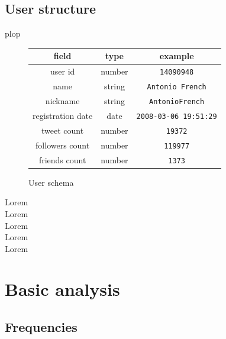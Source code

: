 \documentclass[a4paper,12pt]{report}
\begin{document}
\subsection{User structure}
plop
\begin{figure}[h!]
\centering
\begin{tabular}{c|c|c}
field & type & example\\
\midrule
user id & number & \texttt{14090948} \\ \hline
name & string & \texttt{Antonio French} \\ \hline
nickname & string & \texttt{AntonioFrench} \\ \hline
registration date & date & \texttt{2008-03-06 19:51:29} \\ \hline
tweet count & number & \texttt{19372} \\ \hline
followers count & number & \texttt{119977} \\ \hline
friends count & number & \texttt{1373} \\ \hline
\end{tabular}
\caption{User schema}
\end{figure}
Lorem\\
Lorem\\
Lorem\\
Lorem\\
Lorem\\
\newpage
\section{Basic analysis}

\subsection{Frequencies}
\end{document}
